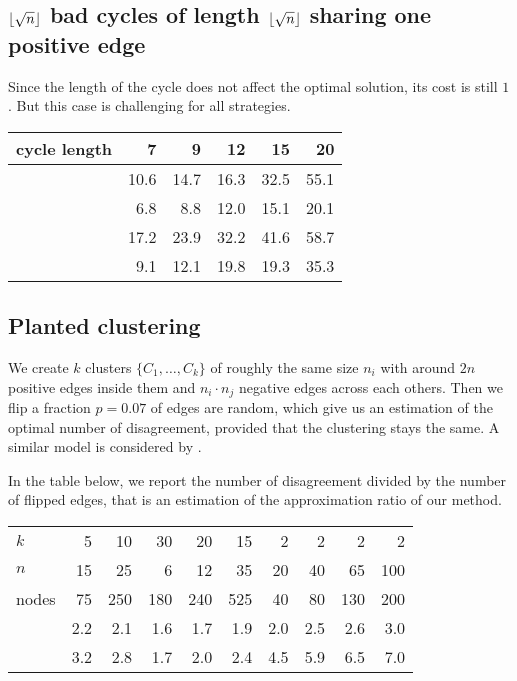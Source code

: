 \subsection{$\floor*{\sqrt{n}}$ bad cycles of length $\floor*{\sqrt{n}}$
	sharing one positive edge}
\label{sub:mixed}

Since the length of the cycle does not affect the optimal solution, its cost
is still $1$. But this case is challenging for all strategies.

\begin{center}
\begin{tabular}{lrrrrr}
\toprule
cycle length & 7    & 9    & 12   & 15   & 20 \\
\midrule
\pot{}       & 10.6 & 14.7 & 16.3 & 32.5 & 55.1 \\
\pat{}       & 6.8  & 8.8  & 12.0 & 15.1 & 20.1 \\
\nnot{}      & 17.2 & 23.9 & 32.2 & 41.6 & 58.7 \\
\nat{}       & 9.1  & 12.1 & 19.8 & 19.3 & 35.3 \\
\bottomrule
\end{tabular}
\end{center}


\subsection{Planted clustering}

We create $k$ clusters $\{C_1, \ldots, C_k\}$ of roughly the same size $n_i$
with around $2n$ positive edges inside them and $n_i\cdot n_j$ negative edges
across each others. Then we flip a fraction $p=0.07$ of edges are random,
which give us an estimation of the optimal number of disagreement, provided
that the clustering stays the same. A similar model is considered by
\textcite{Makarychev2014}.

In the table below, we report the number of disagreement divided by the
number of flipped edges, that is an estimation of the approximation ratio of
our method.

\begin{center}
\begin{tabular}{lrrrrrrrrr}
\toprule
$k$      & 5   & 10  & 30  & 20  & 15  & 2   & 2   & 2   & 2  \\
$n$      & 15  & 25  & 6   & 12  & 35  & 20  & 40  & 65  & 100 \\
nodes    & 75  & 250 & 180 & 240 & 525 & 40  & 80  & 130 & 200 \\
\midrule
\pat{}   & 2.2 & 2.1 & 1.6 & 1.7 & 1.9 & 2.0 & 2.5 & 2.6 & 3.0 \\
\pot{}   & 3.2 & 2.8 & 1.7 & 2.0 & 2.4 & 4.5 & 5.9 & 6.5 & 7.0 \\
\bottomrule
\end{tabular}
\end{center}

